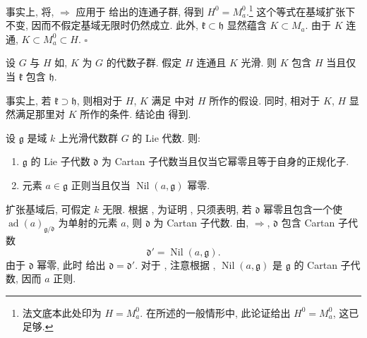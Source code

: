 事实上, 将, \(\Rightarrow\) 应用于 给出的连通子群, 得到 \(H^0=M_a^0\).\footnote{法文底本此处印为 \(H=M_a^0\). 在所述的一般情形中, 此论证给出 \(H^0=M_a^0\), 这已足够.} 这个等式在基域扩张下不变, 因而不假定基域无限时仍然成立. 此外, \(\mathfrak k\subset\mathfrak h\) 显然蕴含 \(K\subset M_a\). 由于 \(K\) 连通, \(K\subset M_a^0\subset H\). \hfill\(\square\)

\begin{corollary}
设 \(G\) 与 \(H\) 如, \(K\) 为 \(G\) 的代数子群. 假定 \(H\) 连通且 \(K\) 光滑. 则 \(K\) 包含 \(H\) 当且仅当 \(\mathfrak k\) 包含 \(\mathfrak h\).
\end{corollary}

事实上, 若 \(\mathfrak k\supset\mathfrak h\), 则相对于 \(H\), \(K\) 满足 中对 \(H\) 所作的假设. 同时, 相对于 \(K\), \(H\) 显然满足那里对 \(K\) 所作的条件. 结论由 得到.

\begin{corollary}
设 \(\mathfrak g\) 是域 \(k\) 上光滑代数群 \(G\) 的 Lie 代数. 则:
\begin{enumerate}
  \item[a)]
  \(\mathfrak g\) 的 Lie 子代数 \(\mathfrak d\) 为 Cartan 子代数当且仅当它幂零且等于自身的正规化子.

  \item[b)]
  元素 \(a\in\mathfrak g\) 正则当且仅当 \(\operatorname{Nil}(a,\mathfrak g)\) 幂零.
\end{enumerate}
\end{corollary}

扩张基域后, 可假定 \(k\) 无限. 根据 , 为证明 , 只须表明, 若 \(\mathfrak d\) 幂零且包含一个使 \(\operatorname{ad}(a)_{\mathfrak g/\mathfrak d}\) 为单射的元素 \(a\), 则 \(\mathfrak d\) 为 Cartan 子代数. 由, \(\Rightarrow\), \(\mathfrak d\) 包含 Cartan 子代数
\[
  \mathfrak d'=\operatorname{Nil}(a,\mathfrak g).
\]
由于 \(\mathfrak d\) 幂零, 此时  给出 \(\mathfrak d=\mathfrak d'\). 对于 , 注意根据 , \(\operatorname{Nil}(a,\mathfrak g)\) 是 \(\mathfrak g\) 的 Cartan 子代数, 因而 \(a\) 正则.

